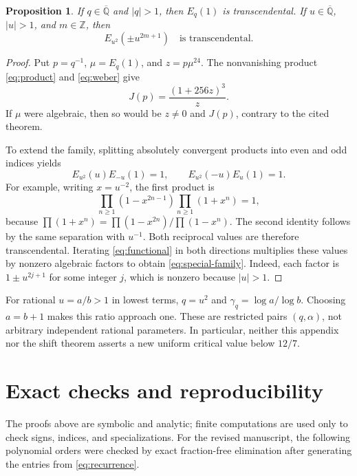 \documentclass[11pt]{article}
\numberwithin{equation}{section}
\newtheorem{proposition}[proposition]{Proposition}
\theoremstyle{definition}
\theoremstyle{remark}
\newcommand{\Z}{\mathbb{Z}}
\newcommand{\Qbar}{\overline{\mathbb{Q}}}
\begin{document}
\begin{proposition}\label{prop:modular}
If $q\in\Qbar$ and $|q|>1$, then $E_q(1)$ is transcendental.
If $u\in\Qbar$, $|u|>1$, and $m\in\Z$, then
\begin{equation}\label{eq:special-family}
 E_{u^2}(\pm u^{2m+1})\quad\text{is transcendental}.
\end{equation}
\end{proposition}
\begin{proof}
Put $p=q^{-1}$, $\mu=E_q(1)$, and $z=p\mu^{24}$.
The nonvanishing product \eqref{eq:product} and \eqref{eq:weber} give
\begin{equation}\label{eq:j-product}
 J(p)=\frac{(1+256z)^3}{z}.
\end{equation}
If $\mu$ were algebraic, then so would be $z\ne0$ and $J(p)$,
contrary to the cited theorem.

To extend the family, splitting absolutely convergent products into even
and odd indices yields
\begin{equation}\label{eq:reciprocal}
 E_{u^2}(u)E_{-u}(1)=1,\qquad
 E_{u^2}(-u)E_u(1)=1.
\end{equation}
For example, writing $x=u^{-2}$, the first product is
\[
 \prod_{n\ge1}(1-x^{2n-1})\prod_{n\ge1}(1+x^n)=1,
\]
because $\prod(1+x^n)=\prod(1-x^{2n})/\prod(1-x^n)$.
The second identity follows by the same separation with $u^{-1}$.
Both reciprocal values are therefore transcendental.
Iterating \eqref{eq:functional} in both directions multiplies these
values by nonzero algebraic factors to obtain \eqref{eq:special-family}.
Indeed, each factor is $1\pm u^{2j+1}$ for some integer $j$, which is nonzero
because $|u|>1$.
\end{proof}

For rational $u=a/b>1$ in lowest terms, $q=u^2$ and
$\gamma_q=\log a/\log b$. Choosing $a=b+1$ makes this ratio approach one.
These are restricted pairs $(q,\alpha)$, not arbitrary independent rational
parameters. In particular, neither this appendix nor the shift theorem
asserts a new uniform critical value below $12/7$.

\section{Exact checks and reproducibility}\label{app:checks}

The proofs above are symbolic and analytic; finite computations are used
only to check signs, indices, and specializations. For the revised manuscript,
the following polynomial orders were checked by exact fraction-free
elimination after generating the entries from \eqref{eq:recurrence}.
\end{document}
